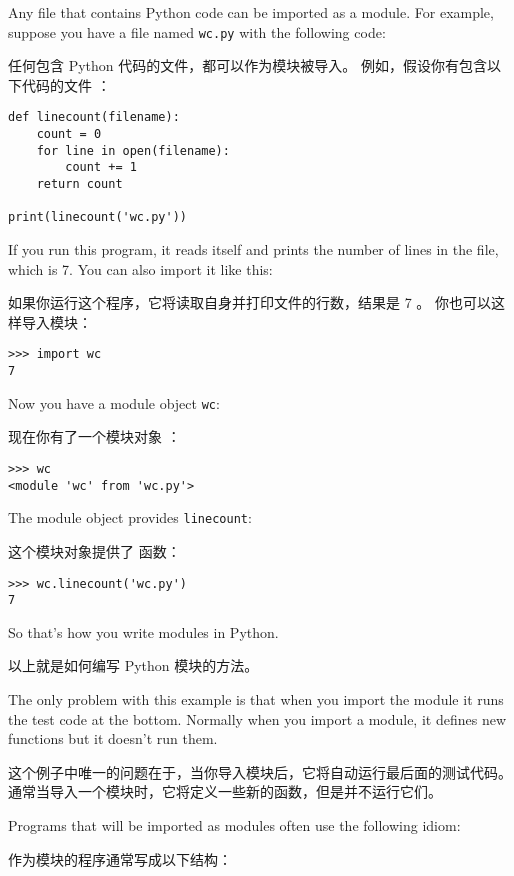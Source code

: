 {{{{{{{Any file that contains Python code can be imported as a module.
For example, suppose you have a file named {\tt wc.py} with the following
code:

任何包含 Python 代码的文件，都可以作为模块被导入。
例如，假设你有包含以下代码的文件  ：

\begin{lstlisting}
def linecount(filename):
    count = 0
    for line in open(filename):
        count += 1
    return count

print(linecount('wc.py'))
\end{lstlisting}
%
If you run this program, it reads itself and prints the number
of lines in the file, which is 7.
You can also import it like this:

如果你运行这个程序，它将读取自身并打印文件的行数，结果是 7 。
你也可以这样导入模块：

\begin{lstlisting}
>>> import wc
7
\end{lstlisting}
%
Now you have a module object {\tt wc}:

现在你有了一个模块对象  ：

  

\begin{lstlisting}
>>> wc
<module 'wc' from 'wc.py'>
\end{lstlisting}
%
The module object provides \verb"linecount":

这个模块对象提供了  函数：

\begin{lstlisting}
>>> wc.linecount('wc.py')
7
\end{lstlisting}
%
So that's how you write modules in Python.

以上就是如何编写 Python 模块的方法。

The only problem with this example is that when you import
the module it runs the test code at the bottom.  Normally
when you import a module, it defines new functions but it
doesn't run them.

这个例子中唯一的问题在于，当你导入模块后，它将自动运行最后面的测试代码。
通常当导入一个模块时，它将定义一些新的函数，但是并不运行它们。

  

Programs that will be imported as modules often
use the following idiom:

作为模块的程序通常写成以下结构：

}}}}}}}
